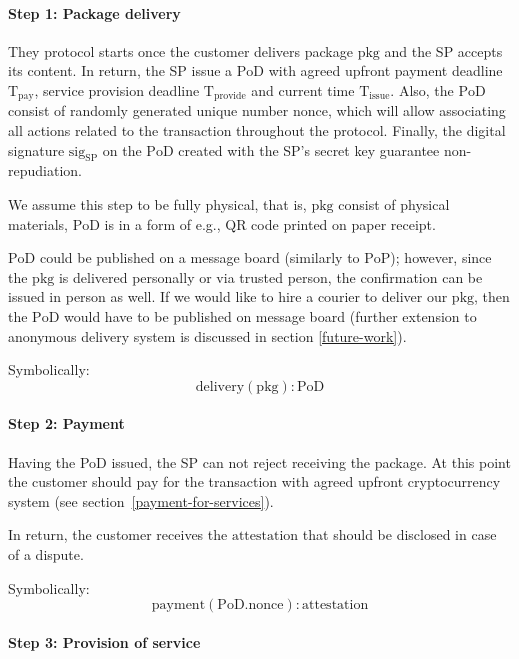 \documentclass{ieeeaccess}
\begin{document}
\paragraph{Step 1: Package delivery}\label{step-1-package-delivery}

They protocol starts once the customer delivers package $\mathrm{pkg}$ and the SP accepts its content. In return, the SP issue a $\mathrm{PoD}$ with agreed upfront payment deadline $\mathrm{T}_\mathrm{pay}$, service provision deadline $\mathrm{T}_\mathrm{provide}$ and current time $\mathrm{T}_\mathrm{issue}$. Also, the $\mathrm{PoD}$ consist of randomly generated unique number $\mathrm{nonce}$, which will allow associating all actions related to the transaction throughout the protocol. Finally, the digital signature $\mathrm{sig}_\mathrm{SP}$ on the $\mathrm{PoD}$ created with the SP's secret key guarantee non-repudiation.

We assume this step to be fully physical, that is, $\mathrm{pkg}$ consist of physical materials, $\mathrm{PoD}$ is in a form of e.g., QR code printed on paper receipt. 

$\mathrm{PoD}$ could be published on a message board (similarly to $\mathrm{PoP}$); however, since the $\mathrm{pkg}$ is delivered personally or via trusted person, the confirmation can be issued in person as well. If we would like to hire a courier to deliver our $\mathrm{pkg}$, then the $\mathrm{PoD}$ would have to be published on message board (further extension to anonymous delivery system is discussed in section \ref{future-work}).

Symbolically: \[
\mathrm{delivery}(\mathrm{pkg}) : \mathrm{PoD}
\]

\paragraph{Step 2: Payment}\label{step-2-payment}

Having the PoD issued, the SP can not reject receiving the package. At this point the
customer should pay for the transaction with agreed upfront cryptocurrency system (see section~\ref{payment-for-services}).

In return, the customer receives the $\mathrm{attestation}$ that should be disclosed in case of a dispute.

Symbolically: \[
\mathrm{payment}(\mathrm{PoD}.\mathrm{nonce}) : \mathrm{attestation}
\]

\paragraph{Step 3: Provision of
service}\label{step-3-provision-of-service}
\end{document}
